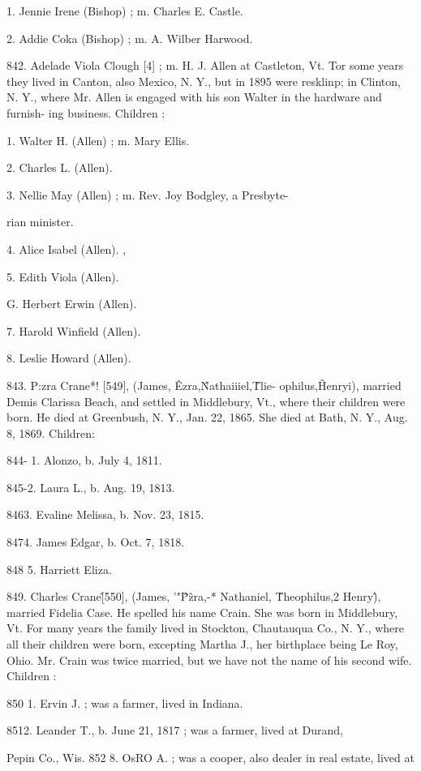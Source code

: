 \documentclass{book}
\begin{document}
1. Jennie Irene (Bishop) ; m. Charles E. Castle. 

2. Addie Coka (Bishop) ; m. A. Wilber Harwood. 

842. Adelade Viola Clough [4] ; m. H. J. Allen at Castleton, Vt. 
Tor some years they lived in Canton, also Mexico, N. Y., 
but in 1895 were resklinp; in Clinton, N. Y., where Mr. Allen 
is engaged with his son Walter in the hardware and furnish- 
ing business. Children : 

1. Walter H. (Allen) ; m. Mary Ellis. 

2. Charles L. (Allen). 

3. Nellie May (Allen) ; m. Rev. Joy Bodgley, a Presbyte- 

rian minister. 

4. Alice Isabel (Allen). , 

5. Edith Viola (Allen). 

G. Herbert Erwin (Allen). 

7. Harold Winfield (Allen). 

8. Leslie Howard (Allen). 

843. P:zra Crane*! [549], (James, \^ Ezra,\^ Nathaiiiel,\^ Tlie- 
ophilus,\^ Henryi), married Demis Clarissa Beach, and settled in 
Middlebury, Vt., where their children were born. He died at 
Greenbush, N. Y., Jan. 22, 1865. She died at Bath, N. Y., 
Aug. 8, 1869. Children: 

844- 1. Alonzo, b. July 4, 1811. 

845-2. Laura L., b. Aug. 19, 1813. 

8463. Evaline Melissa, b. Nov. 23, 1815. 

8474. James Edgar, b. Oct. 7, 1818. 

848 5. Harriett Eliza. 

849. Charles Crane\^ [550], (James, '"\^ P\^zra,-* Nathaniel, \^ 
Theophilus,2 Henry\^), married Fidelia Case. He spelled his 
name Crain. She was born in Middlebury, Vt. For many years 
the family lived in Stockton, Chautauqua Co., N. Y., where all 
their children were born, excepting Martha J., her birthplace 
being Le Roy, Ohio. Mr. Crain was twice married, but we have 
not the name of his second wife. Children : 

850  1. Ervin J. ; was a farmer, lived in Indiana. 

8512. Leander T., b. June 21, 1817 ; was a farmer, lived at Durand, 

Pepin Co., Wis. 
852  8. OsRO A. ; was a cooper, also dealer in real estate, lived at 
\end{document}
